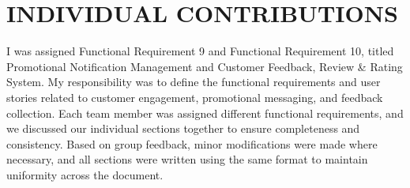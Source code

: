 \chapter{INDIVIDUAL CONTRIBUTIONS} \label{ch:data}
I was assigned Functional Requirement 9 and Functional Requirement 10, titled Promotional Notification Management and Customer Feedback, Review & Rating System. My responsibility was to define the functional requirements and user stories related to customer engagement, promotional messaging, and feedback collection. Each team member was assigned different functional requirements, and we discussed our individual sections together to ensure completeness and consistency. Based on group feedback, minor modifications were made where necessary, and all sections were written using the same format to maintain uniformity across the document.